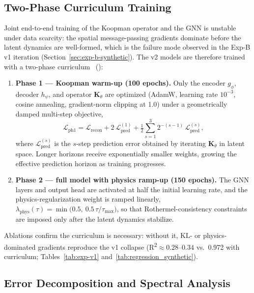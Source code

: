 \documentclass[preprint,12pt,times,numbers]{elsarticle}
\begin{document}
\subsection{Two-Phase Curriculum Training}
\label{sec:curriculum-training}

Joint end-to-end training of the Koopman operator and the GNN is unstable under data scarcity: the spatial message-passing gradients dominate before the latent dynamics are well-formed, which is the failure mode observed in the Exp-B v1 iteration (Section~\ref{sec:exp-b-synthetic}). The v2 models are therefore trained with a two-phase curriculum~\cite{article:bengio2009curriculum} ():

\begin{enumerate}
    \item \textbf{Phase 1 --- Koopman warm-up (100 epochs).} Only the encoder $g_\phi$, decoder $h_\psi$, and operator $\mathbf{K}_\theta$ are optimized (AdamW, learning rate $10^{-3}$, cosine annealing, gradient-norm clipping at 1.0) under a geometrically damped multi-step objective,
    \begin{equation}
    \mathcal{L}_{\text{ph1}} = \mathcal{L}_{\text{recon}} + 2\,\mathcal{L}_{\text{pred}}^{(1)} + \tfrac{1}{2}\sum_{s=1}^{3} 2^{-(s-1)}\,\mathcal{L}_{\text{pred}}^{(s)},
    \label{eq:phase1_loss}
    \end{equation}
    where $\mathcal{L}_{\text{pred}}^{(s)}$ is the $s$-step prediction error obtained by iterating $\mathbf{K}_\theta$ in latent space. Longer horizons receive exponentially smaller weights, growing the effective prediction horizon as training progresses.
    \item \textbf{Phase 2 --- full model with physics ramp-up (150 epochs).} The GNN layers and output head are activated at half the initial learning rate, and the physics-regularization weight is ramped linearly, $\lambda_{\text{phys}}(\tau) = \min\!\bigl(0.5,\ 0.5\,\tau/\tau_{\max}\bigr)$, so that Rothermel-consistency constraints are imposed only after the latent dynamics stabilize.
\end{enumerate}

Ablations confirm the curriculum is necessary: without it, KL- or physics-dominated gradients reproduce the v1 collapse (R\textsuperscript{2}${\approx}0.28$--$0.34$ vs.\ 0.972 with curriculum; Tables~\ref{tab:exp-v1} and~\ref{tab:regression_synthetic}).

\subsection{Error Decomposition and Spectral Analysis}
\label{sec:error-analysis}
\end{document}
